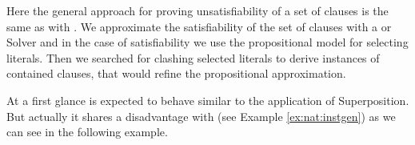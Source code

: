 Here the general approach for proving unsatisfiability of a set of clauses is the same as with \InstGen.
We approximate the satisfiability of the set of clauses with a \SAT or \SMT Solver and in the case
of satisfiability we use the propositional model for selecting literals.
Then we searched for clashing selected literals to derive instances of contained clauses,
that would refine the propositional approximation.






%



At a first glance \InstGenEQ is expected to behave similar to the application of Superposition.
But actually it shares a disadvantage with \InstGen (see Example \ref{ex:nat:instgen}) as we can see in the following example.



